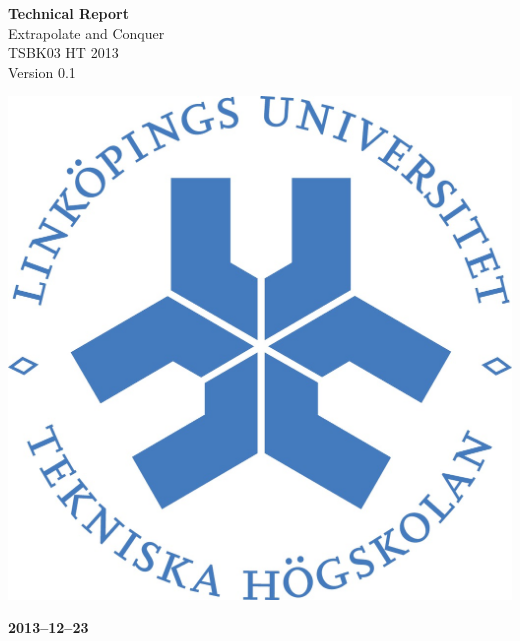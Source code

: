 \documentclass[pdftex, fontsize=11pt, a4paper]{scrbook}
\begin{document}
\begin{titlepage}
\thispagestyle{empty}
\begin{center}
	\vspace*{4\baselineskip}

	\textbf{\huge Technical Report} \\
	\vspace*{0.5\baselineskip}
	{\large  Extrapolate and Conquer} \\
	\vspace*{0.5\baselineskip}
	{\large  TSBK03 HT 2013} \\
	\vspace*{0.5\baselineskip}
	{\large  Version 0.1}


	\vspace*{6\baselineskip}
	\includegraphics[width=0.4\linewidth]{lith_sigill_col}

	\vfill

	\textbf{2013--12--23} \\
	[2\baselineskip]
\end{center}

\end{titlepage}
\end{document}
